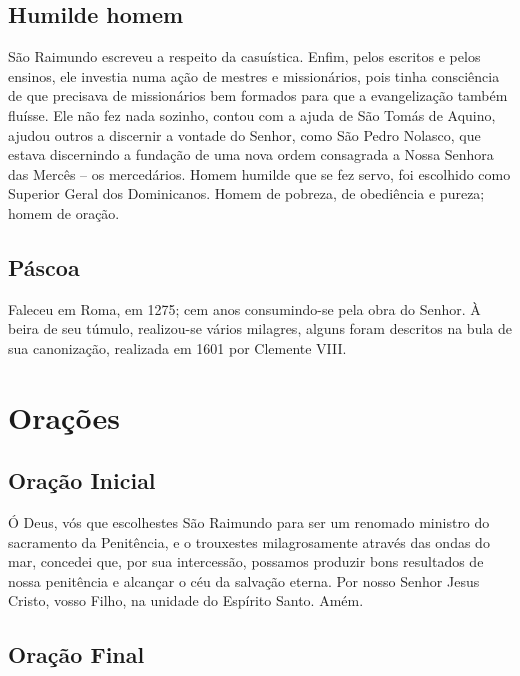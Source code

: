 \documentclass[18pt]{article}
\begin{document}
\begin{justify}
\subsection*{Humilde homem}

São Raimundo escreveu a respeito da casuística. Enfim, pelos escritos e pelos ensinos, ele investia numa ação de mestres e missionários, pois tinha consciência de que precisava de missionários bem formados para que a evangelização também fluísse. Ele não fez nada sozinho, contou com a ajuda de São Tomás de Aquino, ajudou outros a discernir a vontade do Senhor, como São Pedro Nolasco, que estava discernindo a fundação de uma nova ordem consagrada a Nossa Senhora das Mercês – os mercedários. Homem humilde que se fez servo, foi escolhido como Superior Geral dos Dominicanos. Homem de pobreza, de obediência e pureza; homem de oração.

\subsection*{Páscoa}

Faleceu em Roma, em 1275; cem anos consumindo-se pela obra do Senhor. À beira de seu túmulo, realizou-se vários milagres, alguns foram descritos na bula de sua canonização, realizada em 1601 por Clemente VIII.

\end{justify}


\section{Orações}\label{sec:Orações} %

\subsection{Oração Inicial}\label{subsec:OraçãoInicial} %

Ó Deus, vós que escolhestes São Raimundo para ser um renomado ministro do sacramento da Penitência, e o trouxestes milagrosamente através das ondas do mar, concedei que, por sua intercessão, possamos produzir bons resultados de nossa penitência e alcançar o céu da salvação eterna.
Por nosso Senhor Jesus Cristo, vosso Filho, na unidade do Espírito Santo. Amém.

\subsection{Oração Final}\label{subsec:OraçãoFinal} %
\end{document}
